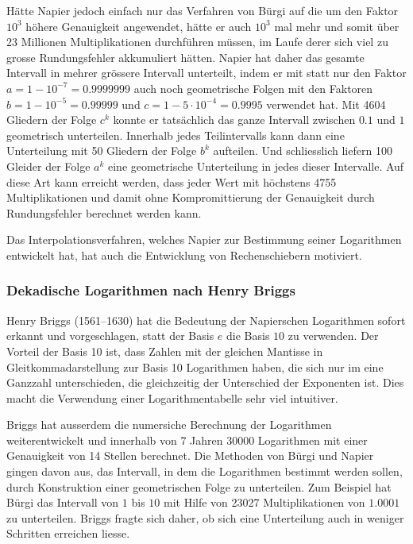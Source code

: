 Hätte Napier jedoch einfach nur das Verfahren von Bürgi auf die um
den Faktor $10^3$ höhere Genauigkeit angewendet, hätte er auch $10^3$
mal mehr und somit über 23 Millionen Multiplikationen durchführen
müssen, im Laufe derer sich viel zu grosse Rundungsfehler akkumuliert
hätten.
Napier hat daher das gesamte Intervall in mehrer grössere Intervall
unterteilt, indem er mit statt nur den Faktor $a=1-10^{-7}=0.9999999$
auch noch geometrische Folgen mit den Faktoren $b=1-10^{-5}=0.99999$ und
$c=1-5\cdot10^{-4}=0.9995$ verwendet hat.
Mit 4604 Gliedern der Folge $c^k$ konnte er tatsächlich das ganze
Intervall zwischen $0.1$ und $1$ geometrisch unterteilen.
Innerhalb jedes Teilintervalls kann dann eine Unterteilung mit
50 Gliedern der Folge $b^k$ aufteilen.
Und schliesslich liefern 100 Gleider der Folge $a^k$ eine geometrische
Unterteilung in jedes dieser Intervalle.
Auf diese Art kann erreicht werden, dass jeder Wert mit höchstens 4755
Multiplikationen und damit ohne Kompromittierung der Genauigkeit durch
Rundungsfehler berechnet werden kann.

Das Interpolationsverfahren, welches Napier zur Bestimmung seiner 
Logarithmen entwickelt hat, hat auch die Entwicklung von Rechenschiebern
motiviert.

%
%
\subsubsection{Dekadische Logarithmen nach Henry Briggs}
Henry Briggs (1561--1630) hat die Bedeutung der Napierschen
Logarithmen sofort erkannt und vorgeschlagen, statt der Basis $e$
die Basis $10$ zu verwenden. 
Der Vorteil der Basis 10 ist, dass Zahlen mit der gleichen
Mantisse in Gleitkommadarstellung zur Basis 10 Logarithmen haben,
die sich nur im eine Ganzzahl unterschieden, die gleichzeitig der
Unterschied der Exponenten ist.
Dies macht die Verwendung einer Logarithmentabelle sehr viel
intuitiver.

Briggs hat ausserdem die numersiche Berechnung der Logarithmen 
weiterentwickelt und innerhalb von 7 Jahren 30000 Logarithmen mit
einer Genauigkeit von 14 Stellen berechnet.
Die Methoden von Bürgi und Napier gingen davon aus, das Intervall,
in dem die Logarithmen bestimmt werden sollen, durch Konstruktion
einer geometrischen Folge zu unterteilen.
Zum Beispiel hat Bürgi das Intervall von $1$ bis $10$ mit Hilfe von
23027 Multiplikationen von $1.0001$ zu unterteilen.
Briggs fragte sich daher, ob sich eine Unterteilung auch in weniger
Schritten erreichen liesse.

